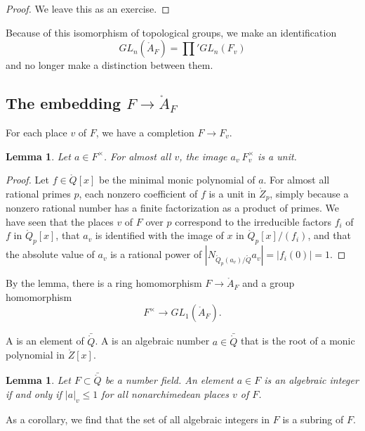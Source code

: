 \documentclass{amsart}
\newtheorem{lemma}[equation]{Lemma}
\def\ZZ{\ring{Z}}
\def\QQ{\ring{Q}}
\def\AA{\ring{A}}
\begin{document}
\begin{proof} We leave this as an exercise.
\end{proof}

Because of this isomorphism of topological groups, we make an identification
\[
GL_n (\AA_F) = \prod' GL_n(F_v)
\]
and no longer make a distinction between them.


\subsection{The embedding $F\to \AA_F$}

For each place $v$ of $F$, we have a completion $F\to F_v$.

\begin{lemma} Let $a\in F^\times$.  For almost all $v$,  the image $a_v\ F^\times_v$ 
is a unit.
\end{lemma}

\begin{proof} Let $f\in\QQ[x]$ be the minimal monic polynomial of $a$.
  For almost all rational primes $p$, each nonzero coefficient of $f$
  is a unit in $\ZZ_p$, simply because a nonzero rational number has a
  finite factorization as a product of primes.  We have seen that the
  places $v$ of $F$ over $p$ correspond to the irreducible factors
  $f_i$ of $f$ in $\QQ_p[x]$, that $a_v$ is identified with the image
  of $x$ in $\QQ_p[x]/(f_i)$, and that the absolute value of $a_v$ is
  a rational power of $|N_{\QQ_p(a_v)/\QQ} a_v| = |f_i(0)| = 1$.
\end{proof}

By the lemma, there is a ring homomorphism $F\to \AA_F$ and a group
homomorphism
\[
F^\times \to GL_1(\AA_F).
\]

A  is an element of $\bar{\QQ}$.  A
 is an algebraic number $a\in\bar{\QQ}$
that is the root of a monic polynomial in $\ring{Z}[x]$.

\begin{lemma} Let $F\subset \bar{\QQ}$ be a number field.  An element
  $a\in F$ is an algebraic integer if and only if $|a|_v\le 1$ for all
  nonarchimedean places $v$ of $F$.
\end{lemma}

  As a corollary, we find that  the set of all algebraic integers in $F$ is a subring of $F$.
\end{document}
